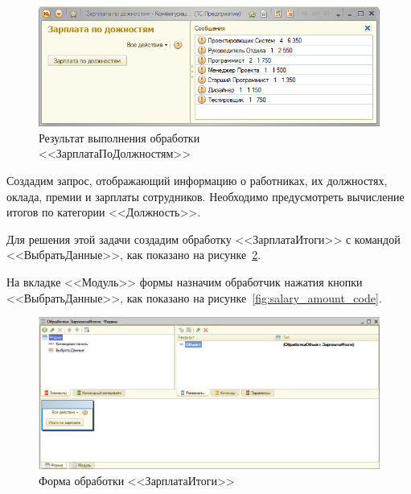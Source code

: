 \begin{figure}[h!]
  \centering
  \includegraphics[width=150mm]{pic/salary_by_positions_results}
  \caption{Результат выполнения обработки \\ <<ЗарплатаПоДолжностям>>}
  \label{fig:salary_by_positions_results}
\end{figure}



Создадим запрос, отображающий информацию о работниках,
их должностях, оклада, премии и зарплаты сотрудников.
Необходимо предусмотреть вычисление итогов по категории
<<Должность>>.

\pagebreak

Для решения этой задачи создадим обработку <<ЗарплатаИтоги>>
с командой <<ВыбратьДанные>>,
как показано на рисунке~\ref{fig:salary_amount_form}.

На вкладке <<Модуль>> формы назначим обработчик нажатия кнопки
<<ВыбратьДанные>>, как показано на рисунке~\ref{fig:salary_amount_code}.

\begin{figure}[h!]
  \centering
  \includegraphics[width=150mm]{pic/salary_amount_form}
  \caption{Форма обработки <<ЗарплатаИтоги>>}
  \label{fig:salary_amount_form}
\end{figure}

